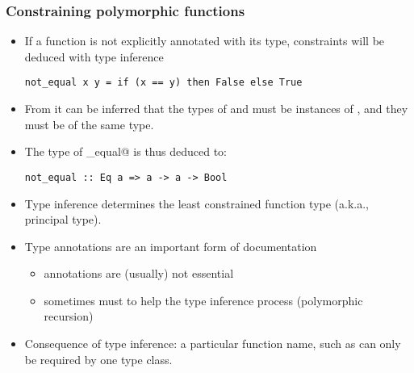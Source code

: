 \documentclass{beamer}
\newcommand{\ttcode}[1]{{\color{red}{\tt{#1}}}}
\begin{document}
\begin{frame}[fragile]
    \frametitle{Constraining polymorphic functions}
\begin{itemize}
\item
If a function is not explicitly annotated with its type, constraints will 
be deduced with type inference 
{\color{red}
\begin{verbatim}
not_equal x y = if (x == y) then False else True 
\end{verbatim}
}

\item
From \ttcode{x == y} it can be inferred that the types of \ttcode{x} and \ttcode{y} must be 
instances of \ttcode{Eq}, and they must be of the same type. 

\item
The type of \verb@not_equal@ is thus deduced to: 
{\color{red}
\begin{verbatim}
not_equal :: Eq a => a -> a -> Bool 
\end{verbatim}
}

\item
Type inference determines the least constrained function type 
(a.k.a., principal type). 

\item Type annotations are an important form of documentation
\begin{itemize}
\item annotations are (usually) not essential
\item sometimes must to help the type inference process (polymorphic recursion) 
\end{itemize}

\item Consequence of type inference: a particular function name, such as \ttcode{==} 
can only be required by one type class.
\end{itemize}
\end{frame}
\end{document}
